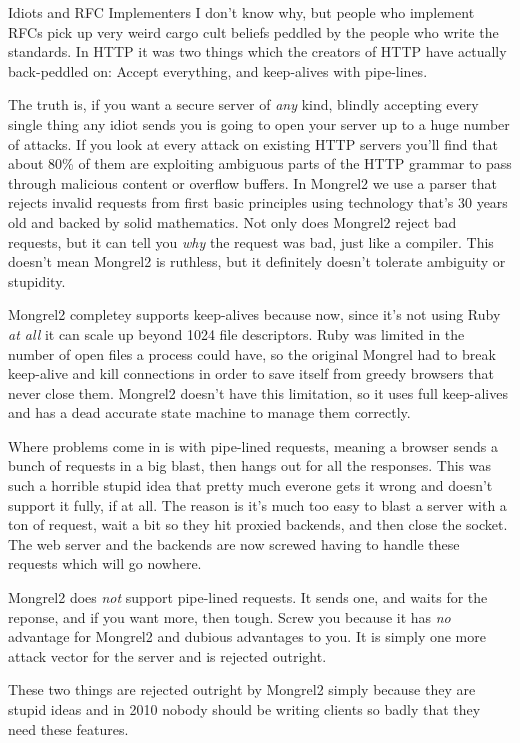 \begin{aside}{Idiots and RFC Implementers}
I don't know why, but people who implement RFCs pick up very weird cargo cult
beliefs peddled by the people who write the standards.  In HTTP it was two things
which the creators of HTTP have actually back-peddled on:  Accept everything, and
keep-alives with pipe-lines.

The truth is, if you want a secure server of \emph{any} kind, blindly accepting
every single thing any idiot sends you is going to open your server up to a
huge number of attacks.  If you look at every attack on existing HTTP servers
you'll find that about 80\% of them are exploiting ambiguous parts of the HTTP
grammar to pass through malicious content or overflow buffers.  In Mongrel2 we
use a parser that rejects invalid requests from first basic principles using
technology that's 30 years old and backed by solid mathematics.  Not only does
Mongrel2 reject bad requests, but it can tell you \emph{why} the request was
bad, just like a compiler.  This doesn't mean Mongrel2 is ruthless, but it
definitely doesn't tolerate ambiguity or stupidity.

Mongrel2 completey supports keep-alives because now, since it's not using Ruby
\emph{at all} it can scale up beyond 1024 file descriptors.  Ruby was limited
in the number of open files a process could have, so the original Mongrel had
to break keep-alive and kill connections in order to save itself from greedy
browsers that never close them.  Mongrel2 doesn't have this limitation, so it
uses full keep-alives and has a dead accurate state machine to manage them correctly.

Where problems come in is with pipe-lined requests, meaning a browser sends a bunch
of requests in a big blast, then hangs out for all the responses.  This was such a
horrible stupid idea that pretty much everone gets it wrong and doesn't support it
fully, if at all.  The reason is it's much too easy to blast a server with a ton
of request, wait a bit so they hit proxied backends, and then close the socket.  The
web server and the backends are now screwed having to handle these requests which will
go nowhere.

Mongrel2 does \emph{not} support pipe-lined requests.  It sends one, and waits for the
reponse, and if you want more, then tough.  Screw you because it has \emph{no} advantage
for Mongrel2 and dubious advantages to you.  It is simply one more attack vector for
the server and is rejected outright.

These two things are rejected outright by Mongrel2 simply because they are stupid ideas
and in 2010 nobody should be writing clients so badly that they need these features.
\end{aside}

